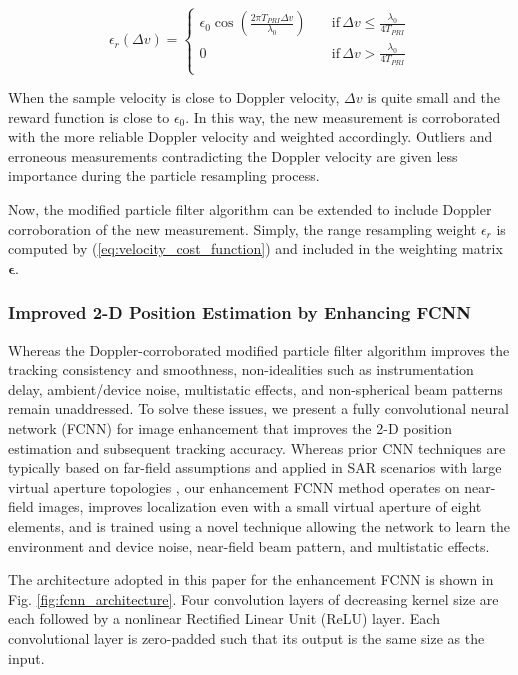 \documentclass[10pt,journal,final]{IEEEtran}
\begin{document}
\begin{equation}
	\label{eq:velocity_cost_function}
	\epsilon_r (\Delta v)=\begin{cases}
		\epsilon_0 \cos \left(\frac{2\pi T_{PRI} \Delta v}{\lambda_0}\right) \quad &\text{if} \, \Delta v \leq \frac{\lambda_0}{4T_{PRI}} \\
		0 \quad &\text{if} \, \Delta v > \frac{\lambda_0}{4T_{PRI}} \\
	\end{cases}
\end{equation}

When the sample velocity is close to Doppler velocity, $\Delta v$ is quite small and the reward function is close to $\epsilon_0$. In this way, the new measurement is corroborated with the more reliable Doppler velocity and weighted accordingly. Outliers and erroneous measurements contradicting the Doppler velocity are given less importance during the particle resampling process. 

Now, the modified particle filter algorithm can be extended to include Doppler corroboration of the new measurement. Simply, the range resampling weight $\epsilon_r$ is computed by (\ref{eq:velocity_cost_function}) and included in the weighting matrix $\bm{\epsilon}$. 

\subsubsection{Improved 2-D Position Estimation by Enhancing FCNN}
\label{subsubsec:improved_2d_position_esitmation_by_FCNN}
Whereas the Doppler-corroborated modified particle filter algorithm improves the tracking consistency and smoothness, non-idealities such as instrumentation delay, ambient/device noise, multistatic effects, and non-spherical beam patterns remain unaddressed. To solve these issues, we present a fully convolutional neural network (FCNN) for image enhancement that improves the 2-D position estimation and subsequent tracking accuracy. Whereas prior CNN techniques are typically based on far-field assumptions and applied in SAR scenarios with large virtual aperture topologies \cite{sar_cnn:enhance1}, our enhancement FCNN method operates on near-field images, improves localization even with a small virtual aperture of eight elements, and is trained using a novel technique allowing the network to learn the environment and device noise, near-field beam pattern, and multistatic effects.

The architecture adopted in this paper for the enhancement FCNN is shown in Fig. \ref{fig:fcnn_architecture}. Four convolution layers of decreasing kernel size are each followed by a nonlinear Rectified Linear Unit (ReLU) layer. Each convolutional layer is zero-padded such that its output is the same size as the input. 
\end{document}
